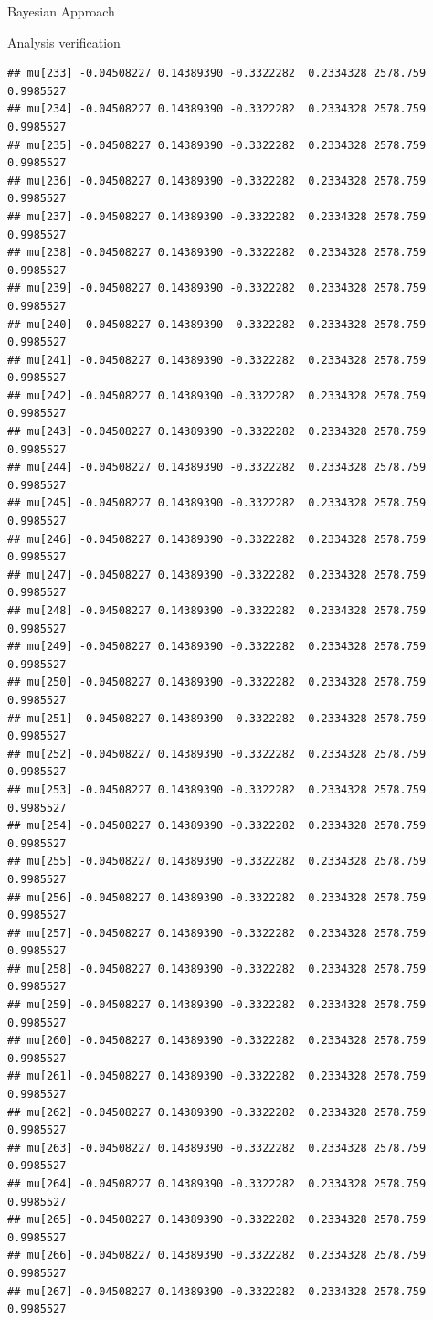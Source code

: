 \documentclass[
  ignorenonframetext,
]{beamer}
\begin{document}
\begin{frame}[fragile]{Bayesian Approach}
\begin{block}{Analysis verification}
\begin{verbatim}
## mu[233] -0.04508227 0.14389390 -0.3322282  0.2334328 2578.759 0.9985527
## mu[234] -0.04508227 0.14389390 -0.3322282  0.2334328 2578.759 0.9985527
## mu[235] -0.04508227 0.14389390 -0.3322282  0.2334328 2578.759 0.9985527
## mu[236] -0.04508227 0.14389390 -0.3322282  0.2334328 2578.759 0.9985527
## mu[237] -0.04508227 0.14389390 -0.3322282  0.2334328 2578.759 0.9985527
## mu[238] -0.04508227 0.14389390 -0.3322282  0.2334328 2578.759 0.9985527
## mu[239] -0.04508227 0.14389390 -0.3322282  0.2334328 2578.759 0.9985527
## mu[240] -0.04508227 0.14389390 -0.3322282  0.2334328 2578.759 0.9985527
## mu[241] -0.04508227 0.14389390 -0.3322282  0.2334328 2578.759 0.9985527
## mu[242] -0.04508227 0.14389390 -0.3322282  0.2334328 2578.759 0.9985527
## mu[243] -0.04508227 0.14389390 -0.3322282  0.2334328 2578.759 0.9985527
## mu[244] -0.04508227 0.14389390 -0.3322282  0.2334328 2578.759 0.9985527
## mu[245] -0.04508227 0.14389390 -0.3322282  0.2334328 2578.759 0.9985527
## mu[246] -0.04508227 0.14389390 -0.3322282  0.2334328 2578.759 0.9985527
## mu[247] -0.04508227 0.14389390 -0.3322282  0.2334328 2578.759 0.9985527
## mu[248] -0.04508227 0.14389390 -0.3322282  0.2334328 2578.759 0.9985527
## mu[249] -0.04508227 0.14389390 -0.3322282  0.2334328 2578.759 0.9985527
## mu[250] -0.04508227 0.14389390 -0.3322282  0.2334328 2578.759 0.9985527
## mu[251] -0.04508227 0.14389390 -0.3322282  0.2334328 2578.759 0.9985527
## mu[252] -0.04508227 0.14389390 -0.3322282  0.2334328 2578.759 0.9985527
## mu[253] -0.04508227 0.14389390 -0.3322282  0.2334328 2578.759 0.9985527
## mu[254] -0.04508227 0.14389390 -0.3322282  0.2334328 2578.759 0.9985527
## mu[255] -0.04508227 0.14389390 -0.3322282  0.2334328 2578.759 0.9985527
## mu[256] -0.04508227 0.14389390 -0.3322282  0.2334328 2578.759 0.9985527
## mu[257] -0.04508227 0.14389390 -0.3322282  0.2334328 2578.759 0.9985527
## mu[258] -0.04508227 0.14389390 -0.3322282  0.2334328 2578.759 0.9985527
## mu[259] -0.04508227 0.14389390 -0.3322282  0.2334328 2578.759 0.9985527
## mu[260] -0.04508227 0.14389390 -0.3322282  0.2334328 2578.759 0.9985527
## mu[261] -0.04508227 0.14389390 -0.3322282  0.2334328 2578.759 0.9985527
## mu[262] -0.04508227 0.14389390 -0.3322282  0.2334328 2578.759 0.9985527
## mu[263] -0.04508227 0.14389390 -0.3322282  0.2334328 2578.759 0.9985527
## mu[264] -0.04508227 0.14389390 -0.3322282  0.2334328 2578.759 0.9985527
## mu[265] -0.04508227 0.14389390 -0.3322282  0.2334328 2578.759 0.9985527
## mu[266] -0.04508227 0.14389390 -0.3322282  0.2334328 2578.759 0.9985527
## mu[267] -0.04508227 0.14389390 -0.3322282  0.2334328 2578.759 0.9985527

\end{verbatim}
\end{block}
\end{frame}
\end{document}
